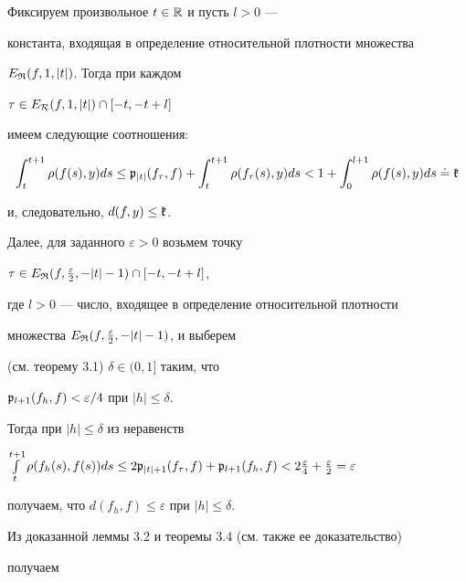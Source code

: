 \begin{pf}


Фиксируем произвольное $t\in\Bbb R$ и пусть $l>0$ ---


константа, входящая в определение относительной плотности множества


$E_{\frak R}(f,1,|t|)$. Тогда при каждом\linebreak


$\tau\in E_{\cal R}(f,1,|t|)\cap [-t,-t+l]$


имеем следующие соотношения:


$$


\int_t^{t+1}\rho(f(s),y)ds\le


\frak p_{|t|}(f_{\tau},f)+


\int_t^{t+1}\rho(f_{\tau}(s),y)ds


<1+\int_0^{l+1}\rho(f(s),y)ds\doteq{\frak k}


$$


и, следовательно, $d(f,y)\le\frak k$.





Далее, для заданного $\varepsilon>0$ возьмем точку


$\tau\in E_{\frak R}(f,\frac{\varepsilon}{2},-|t|-1)\cap [-t,-t+l]$,


где $l>0$ --- число, входящее в определение относительной плотности


множества $E_{\frak R}(f,\frac{\varepsilon}{2},-|t|-1)$, и выберем


(см. теорему 3.1) $\delta\in(0,1]$ таким, что


$\frak p_{l+1}(f_{h},f)<\varepsilon/4$ при $|h|\le\delta$. 


Тогда при $|h|\le\delta$ из неравенств


$\int\limits_t^{t+1}\rho(f_{h}(s),f(s))ds\le


2\frak p_{|t|+1}(f_{\tau},f)+


\frak p_{l+1}(f_{h},f)<2\frac{\varepsilon}{4}+\frac{\varepsilon}{2}


=\varepsilon$


получаем, что $d(f_{h},f)\le\varepsilon$ при $|h|\le\delta$.


\end{pf}





Из доказанной леммы 3.2 и теоремы 3.4 (см. также ее доказательство)


получаем








